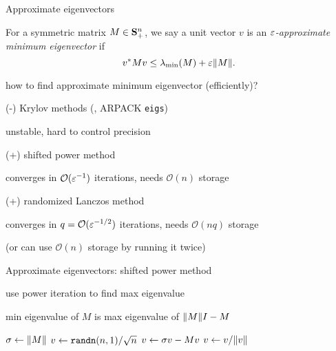 \documentclass[presentation,xcolor={usenames,dvipsnames}]{beamer}
\begin{document}
\begin{frame}{Approximate eigenvectors}

\begin{definition}
For a symmetric matrix $M \in \mathbf{S}_+^n$, we say
a unit vector $v$ is an \emph{$\varepsilon$-approximate minimum eigenvector} if
\[
v^* M v	\leq \lambda_{\rm min}(M) + \varepsilon \|M\|.
\]
\end{definition}

\pause \vfill
how to find approximate minimum eigenvector (efficiently)?
\bit
\item (-) Krylov methods (\eg, ARPACK \texttt{eigs})
\bit \item unstable, hard to control precision \eit
\item (+) shifted power method
\bit \item converges in $\mathcal O(\varepsilon^{-1})$ iterations, needs $\mathcal O(n)$ storage \eit
\item (+) randomized Lanczos method
\bit \item converges in $q = \mathcal O(\varepsilon^{-1/2})$ iterations, needs $\mathcal O(nq)$ storage
\item (or can use $\mathcal O(n)$ storage by running it twice) \eit
\eit

\end{frame}

\begin{frame}{Approximate eigenvectors: shifted power method}

\bit
\item use power iteration to find max eigenvalue
\item min eigenvalue of $M$ is max eigenvalue of $\|M\|I - M$
\eit

	\begin{algorithm}[H] %
	  \caption{\textsf{ApproxMinEvec} via randomized shifted power method}
	  \begin{algorithmic}[1]


	\vspace{0.5pc}


	  	\State	$\sigma \gets \|M\|$ %
			\State	$v \gets \texttt{randn}(n, 1) / \sqrt{n}$
	  		\State	$v \gets \sigma v - M v$
				\State	$v \gets v / \|v\|$
		\EndFor
		\State	{}
		\EndFunction

	\end{algorithmic}
	\end{algorithm}

\end{frame}
\end{document}
